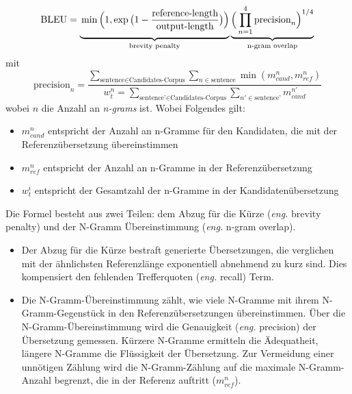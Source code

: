 \begin{equation}
	\text{BLEU} = \underbrace{\vphantom{\prod_i^4}\min\Big(1,\exp\big(1-\frac{\text{reference-length}}{\text{output-length}}\big)\Big)}_{\text{brevity penalty}}
\underbrace{\Big(\prod_{n=1}^{4}
\text{precision}_n\Big)^{1/4}}_{\text{n-gram overlap}}
\end{equation}
mit
\begin{equation}
	\text{precision}_n = \dfrac{\sum_{\text{sentence}\in\text{Candidates-Corpus}}\sum_{n\in\text{sentence}}\min(m^n_{cand}, m^n_{ref})}
{w_t^n = \sum_{\text{sentence'}\in\text{Candidates-Corpus}}\sum_{n'\in\text{sentence'}} m^{n'}_{cand}}
\end{equation}
wobei $n$ die Anzahl an \textit{n-grams} ist.
\newline
\newline
Wobei Folgendes gilt:
\begin{itemize}
	\setlength\itemsep{0em}
	\item $m^n_{cand}$ entspricht der Anzahl an n-Gramme für den Kandidaten, die mit der Referenzübersetzung
	übereinstimmen
	\item $m^n_{ref}$ entspricht der Anzahl an n-Gramme in der Referenzübersetzung
	\item $w^i_t$ entspricht der Gesamtzahl der n-Gramme in der Kandidatenübersetzung
\end{itemize}
Die Formel besteht aus zwei Teilen: dem Abzug für die Kürze (\textit{eng.} brevity penalty) und der N-Gramm
Übereinstimmung (\textit{eng.} n-gram overlap).
\begin{itemize}
	\setlength\itemsep{0em}
	\item Der Abzug für die Kürze bestraft generierte Übersetzungen, die verglichen mit der ähnlichsten Referenzlänge
	exponentiell abnehmend zu kurz sind. Dies kompensiert den fehlenden Trefferquoten (\textit{eng.} recall) Term.
	\item Die N-Gramm-Übereinstimmung zählt, wie viele N-Gramme mit ihrem N-Gramm-Gegenstück in den
	Referenzübersetzungen übereinstimmen. Über die N-Gramm-Übereinstimmung wird die Genauigkeit (\textit{eng.}
	precision) der Übersetzung gemessen. Kürzere N-Gramme ermitteln die Ädequatheit, längere N-Gramme die Flüssigkeit
	der Übersetzung. Zur Vermeidung einer unnötigen Zählung wird die N-Gramm-Zählung auf die maximale N-Gramm-Anzahl
	begrenzt, die in der Referenz auftritt ($m_{ref}^n$).
\end{itemize}

